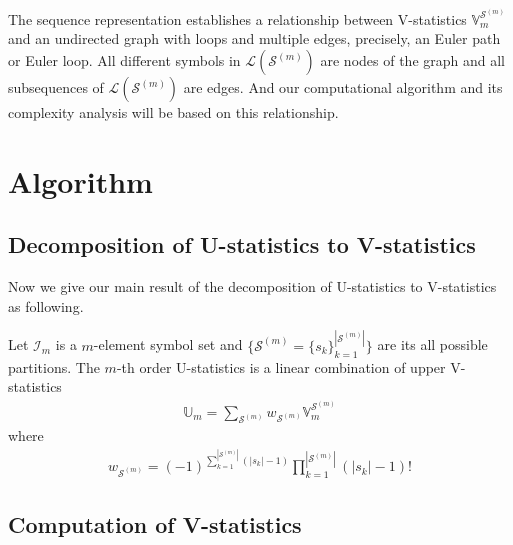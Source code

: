 \documentclass{biometrika}
\renewcommand{\_}{\raisebox{.5pt}{\underline{\phantom{x}}}}
\def\bbU{\mathbb{U}}
\def\bbV{\mathbb{V}}
\def\bA{\mathbf{A}}
\def\calS{\mathcal{S}}
\begin{document}
\begin{bibunit}[biometrika]
\begin{remark}
    The sequence representation establishes a relationship between V-statistics $\bbV_{m}^{\mathcal{S}^{(m)}}$ and an undirected graph
    with loops and multiple edges, precisely, an Euler path or Euler loop.
    All different symbols in $\mathcal{L}(\calS^{(m)})$ are nodes of the graph and all subsequences of $\mathcal{L}(\calS^{(m)})$ are edges. And our computational algorithm and its complexity analysis will be based on this relationship.
\end{remark}



\section{Algorithm}
\subsection{Decomposition of U-statistics to V-statistics}
Now we give our main result of the decomposition of U-statistics to V-statistics as following.

\begin{theorem}
    Let $\mathcal{I}_m$ is a $m$-element symbol set and $\{\mathcal{S}^{(m)} = \{s_k\}_{k=1}^{|\mathcal{S}^{(m)}|}\}$ are its all possible partitions. The $m$-th order U-statistics is a linear combination of upper V-statistics
    \begin{align*}
        \bbU_m = \sum_{\mathcal{S}^{(m)}} w_{\mathcal{S}^{(m)}}\bbV_m^{\mathcal{S}^{(m)}}
    \end{align*}
    where
    \begin{align*}
        w_{\mathcal{S}^{(m)}} = (-1)^{\sum_{k=1}^{|\mathcal{S}^{(m)}|} (|s_k| - 1)} \prod_{k=1}^{|\mathcal{S}^{(m)}|} (|s_k| - 1)!
    \end{align*}
\end{theorem}
\subsection{Computation of V-statistics}


\end{bibunit}
\end{document}
